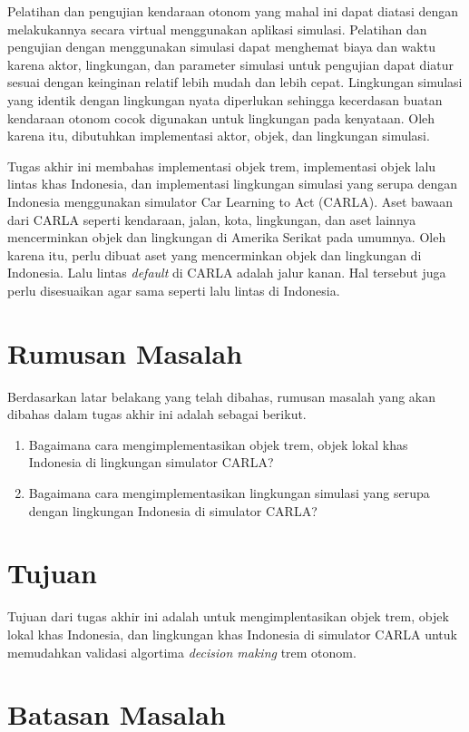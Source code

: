 Pelatihan dan pengujian kendaraan otonom yang mahal ini dapat diatasi dengan
melakukannya secara virtual menggunakan aplikasi simulasi. Pelatihan dan
pengujian dengan menggunakan simulasi dapat menghemat biaya dan waktu karena
aktor, lingkungan, dan parameter simulasi untuk pengujian dapat diatur sesuai
dengan keinginan relatif lebih mudah dan lebih cepat. Lingkungan simulasi yang
identik dengan lingkungan nyata diperlukan sehingga kecerdasan buatan kendaraan
otonom cocok digunakan untuk lingkungan pada kenyataan. Oleh karena itu,
dibutuhkan implementasi aktor, objek, dan lingkungan simulasi.

Tugas akhir ini membahas implementasi objek trem, implementasi objek lalu lintas
khas Indonesia, dan implementasi lingkungan simulasi yang serupa dengan
Indonesia menggunakan simulator Car Learning to Act (CARLA). Aset bawaan dari
CARLA seperti kendaraan, jalan, kota, lingkungan, dan aset lainnya mencerminkan
objek dan lingkungan di Amerika Serikat pada umumnya. Oleh karena itu, perlu
dibuat aset yang mencerminkan objek dan lingkungan di Indonesia. Lalu lintas
\textit{default} di CARLA adalah jalur kanan. Hal tersebut juga perlu
disesuaikan agar sama seperti lalu lintas di Indonesia.

\section{Rumusan Masalah}

Berdasarkan latar belakang yang telah dibahas, rumusan masalah yang akan dibahas
dalam tugas akhir ini adalah sebagai berikut.
\begin{enumerate}
	\item Bagaimana cara mengimplementasikan objek trem, objek lokal khas
	Indonesia di lingkungan simulator CARLA?
	\item Bagaimana cara mengimplementasikan lingkungan simulasi yang serupa
	dengan lingkungan Indonesia di simulator CARLA?
\end{enumerate}

\section{Tujuan}

Tujuan dari tugas akhir ini adalah untuk mengimplentasikan objek trem, objek
lokal khas Indonesia, dan lingkungan khas Indonesia di simulator CARLA untuk
memudahkan validasi algortima \textit{decision making} trem otonom.

\section{Batasan Masalah}

